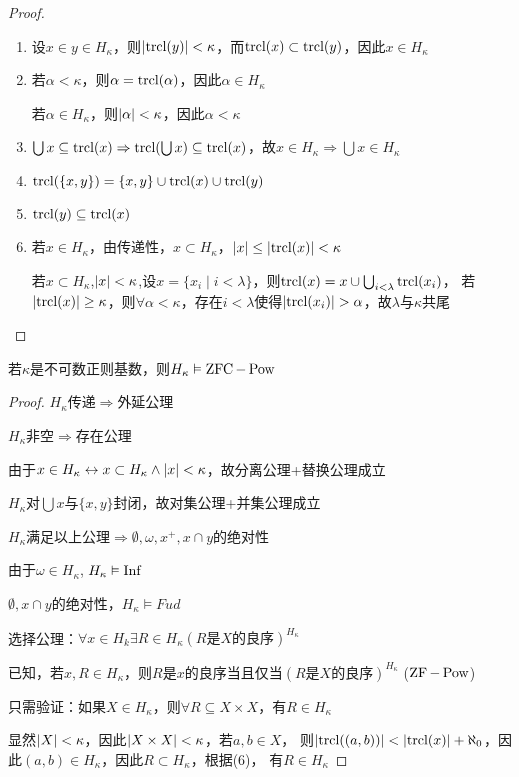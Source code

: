 \documentclass[11pt]{article}
\begin{document}
\begin{proof}
\begin{enumerate}
\item 设\(x\in y\in H_\kappa\)，则\(\abs{\trcl(y)}<\kappa\)，而\(\operatorname{\text{trcl}}(x)\subset\operatorname{\text{trcl}}(y)\)，因此\(x\in H_\kappa\)
\item 若\(\alpha<\kappa\)，则\(\alpha=\operatorname{\text{trcl}}(\alpha)\)，因此\(\alpha\in H_\kappa\)

若\(\alpha\in H_\kappa\)，则\(\abs{\alpha}<\kappa\)，因此\(\alpha<\kappa\)
\item \(\bigcup x\subseteq\operatorname{\text{trcl}}(x)\Rightarrow\operatorname{\text{trcl}}(\bigcup x)\subseteq\operatorname{\text{trcl}}(x)\)，故\(x\in H_\kappa\Rightarrow\bigcup x\in H_\kappa\)
\item \(\operatorname{\text{trcl}}(\{x,y\})=\{x,y\}\cup\operatorname{\text{trcl}}(x)\cup\operatorname{\text{trcl}}(y)\)
\item \(\operatorname{\text{trcl}}(y)\subseteq\operatorname{\text{trcl}}(x)\)
\item 若\(x\in H_\kappa\)，由传递性，\(x\subset H_\kappa\)，\(\abs{x}\le\abs{\trcl(x)}<\kappa\)

若\(x\subset H_\kappa\),\(\abs{x}<\kappa\),设\(x=\{x_i\mid i<\lambda\}\)，则\(\operatorname{\text{trcl}}(x)=x\cup\bigcup_{i<\lambda}\operatorname{\text{trcl}}(x_i)\)，
若\(\abs{\trcl(x)}\ge\kappa\)，则\(\forall\alpha<\kappa\)，存在\(i<\lambda\)使得\(\abs{\trcl(x_i)}>\alpha\)，故\(\lambda\)与\(\kappa\)共尾
\end{enumerate}
\end{proof}

\begin{theorem}[ZFC]
若\(\kappa\)是不可数正则基数，则\(H_\kappa\vDash\operatorname{ZFC}-\operatorname{Pow}\)
\end{theorem}

\begin{proof}
\(H_\kappa\)传递\(\Rightarrow\)外延公理

\(H_\kappa\)非空\(\Rightarrow\)存在公理

由于\(x\in H_\kappa\leftrightarrow x\subset H_\kappa\wedge\abs{x}<\kappa\)，故分离公理+替换公理成立

\(H_\kappa\)对\(\bigcup x\)与\(\{x,y\}\)封闭，故对集公理+并集公理成立

\(H_\kappa\)满足以上公理\(\Rightarrow \emptyset,\omega,x^+,x\cap y\)的绝对性

由于\(\omega\in H_\kappa\), \(H_\kappa\vDash\operatorname{Inf}\)

\(\emptyset,x\cap y\)的绝对性，\(H_\kappa\vDash Fud\)

选择公理：\(\forall x\in H_k\exists R\in H_\kappa(R\text{是$X$的良序})^{H_\kappa}\)

已知，若\(x,R\in H_\kappa\)，则\(R\)是\(x\)的良序当且仅当\((R\text{是$X$的良序})^{H_\kappa}\) (\(\operatorname{ZF}-\operatorname{Pow}\))

只需验证：如果\(X\in H_\kappa\)，则\(\forall R\subseteq X\times X\)，有\(R\in H_\kappa\)

显然\(\abs{X}<\kappa\)，因此\(\abs{X\times X}<\kappa\)，若\(a,b\in X\)，
则\(\abs{\trcl((a,b))}<\abs{\trcl(x)}+\aleph_0\)，因此\((a,b)\in H_\kappa\)，因此\(R\subset H_\kappa\)，根据(6)，
有\(R\in H_\kappa\)
\end{proof}
\end{document}
